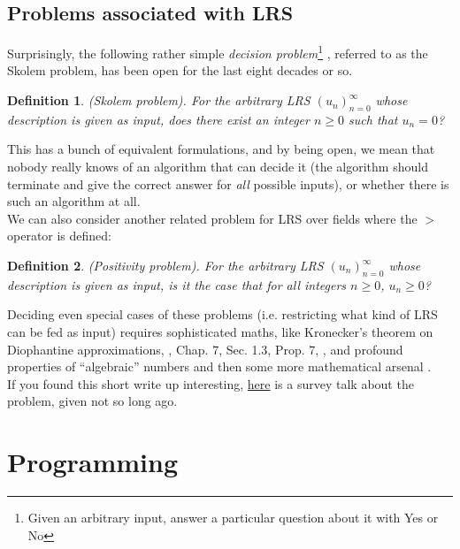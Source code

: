 \documentclass[a4paper,11pt]{article}
\newtheorem{definition}{Definition}
\numberwithin{definition}{section}
\numberwithin{mytheorem}{subsection}
\begin{document}
\subsection{Problems associated with LRS}

Surprisingly, the following rather simple \emph{decision problem}\footnote{Given an arbitrary input, answer a particular question about it with Yes or No} , referred to as the Skolem problem,
has been open for the last eight decades or so.

\begin{definition}
\emph{(Skolem problem)}. For the arbitrary LRS $(u_n)^\infty_{n=0}$ whose description is given as
input, does there exist an integer $n \geq 0$ such that $u_n = 0$?
\end{definition}
This has a bunch of equivalent formulations, and by being open, we mean that nobody really knows of an algorithm that can decide it (the algorithm should terminate and give the correct
answer for \emph{all} possible inputs), or whether there is such an algorithm at all.\\
We can also consider another related problem for LRS over fields where the $>$ operator is defined:

\begin{definition}
\emph{(Positivity problem)}. For the arbitrary LRS $(u_n)^\infty_{n=0}$ whose description is given as
input, is it the case that for all integers $n \geq 0$, $u_n \geq 0$?
\end{definition}
Deciding even special cases of these problems (i.e. restricting what kind of LRS can be fed as
input) requires sophisticated maths, like Kronecker’s theorem on Diophantine approximations, \cite{Bourbaki}, Chap. 7, Sec. 1.3, Prop. 7,
, and profound properties of “algebraic” numbers \cite{Mignotte} and then some
more mathematical arsenal \cite{JPBell, Renegar}.\\
If you found this short write up interesting, \hyperlink{https://fmindia.cmi.ac.in/update2013/presentations/S-Akshay.pdf}{here} is a survey talk about the problem, given not so
long ago.
\newpage



\section{Programming}
\end{document}
